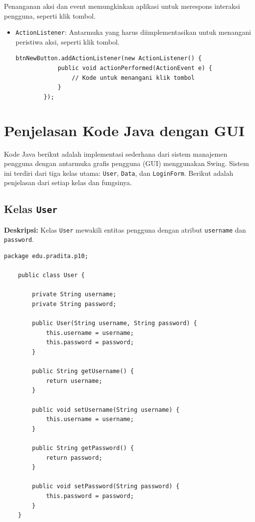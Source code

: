 Penanganan aksi dan event memungkinkan aplikasi untuk merespons interaksi pengguna, seperti klik tombol.

\begin{itemize}
	\item \texttt{ActionListener}: Antarmuka yang harus diimplementasikan untuk menangani peristiwa aksi, seperti klik tombol.
	\begin{lstlisting}[style=JavaStyle]
		btnNewButton.addActionListener(new ActionListener() {
			public void actionPerformed(ActionEvent e) {
				// Kode untuk menangani klik tombol
			}
		});
	\end{lstlisting}
\end{itemize}




\section{Penjelasan Kode Java dengan GUI}

Kode Java berikut adalah implementasi sederhana dari sistem manajemen pengguna dengan antarmuka grafis pengguna (GUI) menggunakan Swing. Sistem ini terdiri dari tiga kelas utama: \texttt{User}, \texttt{Data}, dan \texttt{LoginForm}. Berikut adalah penjelasan dari setiap kelas dan fungsinya.

\subsection{Kelas \texttt{User}}

\textbf{Deskripsi:} Kelas \texttt{User} mewakili entitas pengguna dengan atribut \texttt{username} dan \texttt{password}.

\begin{lstlisting}[style=JavaStyle]
	package edu.pradita.p10;
	
	public class User {
		
		private String username;
		private String password;
		
		public User(String username, String password) {
			this.username = username;
			this.password = password;
		}
		
		public String getUsername() {
			return username;
		}
		
		public void setUsername(String username) {
			this.username = username;
		}
		
		public String getPassword() {
			return password;
		}
		
		public void setPassword(String password) {
			this.password = password;
		}
	}
\end{lstlisting}

